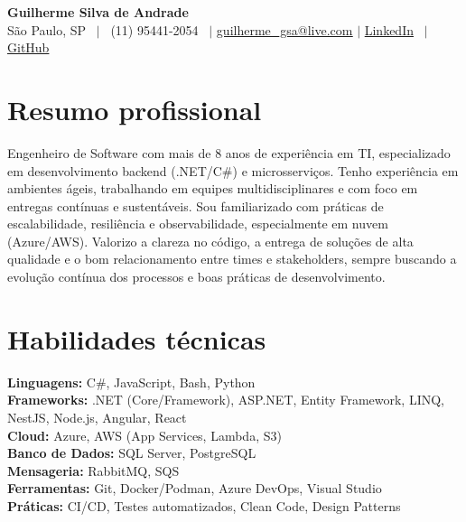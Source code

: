 \documentclass[letterpaper,11pt]{article}
\begin{document}
\begin{center}
    \textbf{\Huge \bfseries Guilherme Silva de Andrade} \\ \vspace{1pt}
    \small São Paulo, SP \ $|$ \ (11) 95441-2054 \ $|$ 
    \href{mailto:guilherme\_gsa@live.com}{\underline{guilherme\_gsa@live.com}} $|$ 
    \href{https://www.linkedin.com/in/xgandrade}{LinkedIn} \ $|$ 
    \href{https://github.com/xgandrade}{GitHub}
\end{center}

\section{Resumo profissional}
\justifying
Engenheiro de Software com mais de 8 anos de experiência em TI, especializado em desenvolvimento backend (.NET/C\#) e microsserviços. Tenho experiência em ambientes ágeis, trabalhando em equipes multidisciplinares e com foco em entregas contínuas e sustentáveis. Sou familiarizado com práticas de escalabilidade, resiliência e observabilidade, especialmente em nuvem (Azure/AWS). Valorizo a clareza no código, a entrega de soluções de alta qualidade e o bom relacionamento entre times e stakeholders, sempre buscando a evolução contínua dos processos e boas práticas de desenvolvimento.

\section{Habilidades técnicas}
 \begin{itemize}[leftmargin=0.15in, label={}]
    \small{\item{
        \textbf{Linguagens:} C\#, JavaScript, Bash, Python \\
        \textbf{Frameworks:} .NET (Core/Framework), ASP.NET, Entity Framework, LINQ, NestJS, Node.js, Angular, React \\
        \textbf{Cloud:} Azure, AWS (App Services, Lambda, S3) \\
        \textbf{Banco de Dados:} SQL Server, PostgreSQL \\
        \textbf{Mensageria:} RabbitMQ, SQS \\
        \textbf{Ferramentas:} Git, Docker/Podman, Azure DevOps, Visual Studio \\
        \textbf{Práticas:} CI/CD, Testes automatizados, Clean Code, Design Patterns
    }}
 \end{itemize}
\end{document}
